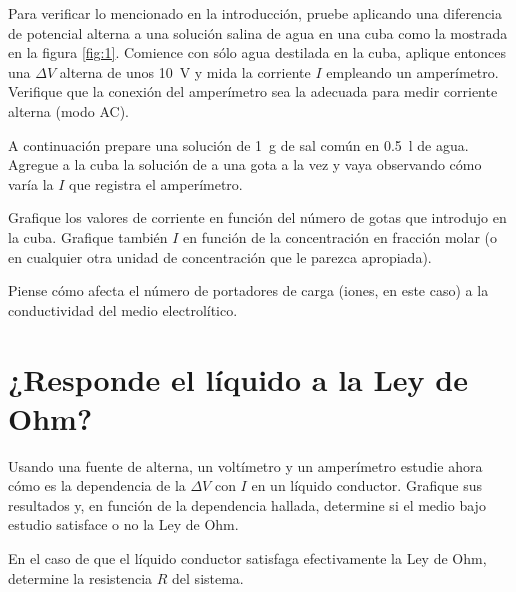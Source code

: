 \documentclass[laboratorio]{guia}
\begin{document}
Para verificar lo mencionado en la introducción, pruebe aplicando una diferencia de potencial alterna a una solución salina de agua en una cuba como la mostrada en la figura \ref{fig:1}.
Comience con sólo agua destilada en la cuba, aplique entonces una \(\Delta V\) alterna de unos \SI{10}{\volt} y mida la corriente \(I\) empleando un amperímetro.
Verifique que la conexión del amperímetro sea la adecuada para medir corriente alterna (modo AC). 

A continuación prepare una solución de \SI{1}{\gram} de sal común en \SI{0.5}{\litre} de agua.
Agregue a la cuba la solución de a una gota a la vez y vaya observando cómo varía la \(I\) que registra el amperímetro. 

Grafique los valores de corriente en función del número de gotas que introdujo en la cuba.
Grafique también \(I\) en función de la concentración en fracción molar (o en cualquier otra unidad de concentración que le parezca apropiada). 

Piense cómo afecta el número de portadores de carga (iones, en este caso) a la conductividad del medio electrolítico. 


\section{¿Responde el líquido a la Ley de Ohm?}
Usando una fuente de alterna, un voltímetro y un amperímetro estudie ahora cómo es la dependencia de la \(\Delta V\) con \(I\) en un líquido conductor.
Grafique sus resultados y, en función de la dependencia hallada, determine si el medio bajo estudio satisface o no la Ley de Ohm. 

En el caso de que el líquido conductor satisfaga efectivamente la Ley de Ohm, determine la resistencia \(R\) del sistema.




\nocite{Alonso1998,Purcell1988,Reitz1996}
 

\end{document}
